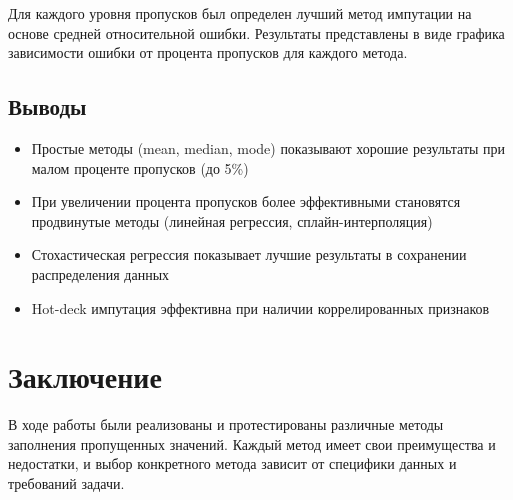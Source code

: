 \documentclass[12pt,a4paper]{article}
\begin{document}
Для каждого уровня пропусков был определен лучший метод импутации на основе средней относительной ошибки. Результаты представлены в виде графика зависимости ошибки от процента пропусков для каждого метода.

\subsection{Выводы}
\begin{itemize}
    \item Простые методы (mean, median, mode) показывают хорошие результаты при малом проценте пропусков (до 5\%)
    \item При увеличении процента пропусков более эффективными становятся продвинутые методы (линейная регрессия, сплайн-интерполяция)
    \item Стохастическая регрессия показывает лучшие результаты в сохранении распределения данных
    \item Hot-deck импутация эффективна при наличии коррелированных признаков
\end{itemize}

\section{Заключение}
В ходе работы были реализованы и протестированы различные методы заполнения пропущенных значений. Каждый метод имеет свои преимущества и недостатки, и выбор конкретного метода зависит от специфики данных и требований задачи.
\end{document}

